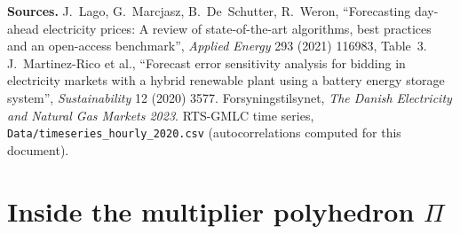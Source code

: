 \documentclass[10pt,a4paper]{article}
\newcommand{\code}[1]{\texttt{#1}}
\begin{document}
{\small\textbf{Sources.}
J.~Lago, G.~Marcjasz, B.~De~Schutter, R.~Weron, ``Forecasting day-ahead electricity prices: A review of
state-of-the-art algorithms, best practices and an open-access benchmark'', \emph{Applied Energy} 293 (2021)
116983, Table~3.
J.~Martinez-Rico et al., ``Forecast error sensitivity analysis for bidding in electricity markets with a hybrid
renewable plant using a battery energy storage system'', \emph{Sustainability} 12 (2020) 3577.
Forsyningstilsynet, \emph{The Danish Electricity and Natural Gas Markets 2023}.
RTS-GMLC time series, \code{Data/timeseries\_hourly\_2020.csv} (autocorrelations computed for this document).}

\section{Inside the multiplier polyhedron $\Pi$}
\label{sec:poly}
\end{document}
